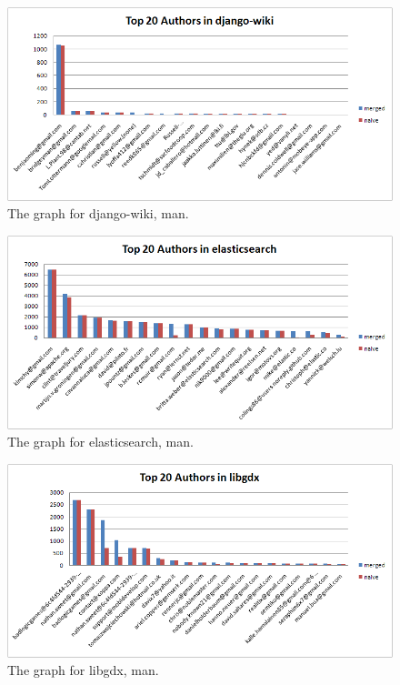 \documentclass{article}
\begin{document}
\begin{figure}[h]
  \centering
  \includegraphics[width=1\textwidth]{../presentation/img/graph-django-wiki.png}
  \caption{The graph for django-wiki, man.}
  \label{fig:graph-django-wiki}
\end{figure}

\begin{figure}[h]
  \centering
  \includegraphics[width=1\textwidth]{../presentation/img/graph-elasticsearch.png}
  \caption{The graph for elasticsearch, man.}
  \label{fig:graph-elasticsearch}
\end{figure}

\begin{figure}[h]
  \centering
  \includegraphics[width=1\textwidth]{../presentation/img/graph-libgdx.png}
  \caption{The graph for libgdx, man.}
  \label{fig:graph-libgdx}
\end{figure}
\end{document}
